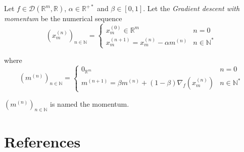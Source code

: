 \documentclass[11pt,en]{elegantpaper}
\newcommand{\Real}{\mathbb{R}}
\begin{document}
\begin{definition}
  Let $f \in \mathcal{D}(\Real^m,\Real)$, $\alpha \in \Real^{+*}$ and $\beta \in [0,1]$. Let the \textit{Gradient descent with momentum}
  be the numerical sequence \begin{equation}\label{def:stochastic_grad_descent}
    (x_m^{(n)})_{n \in \mathbb{N}} = \left\{
      \begin{array}{ll}
        x_m^{(0)} \in \Real^m & n = 0 \\
        x_m^{(n+1)} = x_m^{(n)} - \alpha m^{(n)} & n \in \mathbb{N}^*
      \end{array}
    \right.
  \end{equation} \par

  where \begin{equation*}
    (m^{(n)})_{n \in \mathbb{N}} = \left\{
      \begin{array}{ll}
        0_{\Real^m} & n = 0 \\
        m^{(n+1)} = \beta m^{(n)} + (1 - \beta) \nabla_f(x_m^{(n)}) & n \in \mathbb{N}^*
      \end{array}
    \right.
  \end{equation*} \par

  $(m^{(n)})_{n \in \mathbb{N}}$ is named the momentum.
\end{definition}


\section{References}
\end{document}
